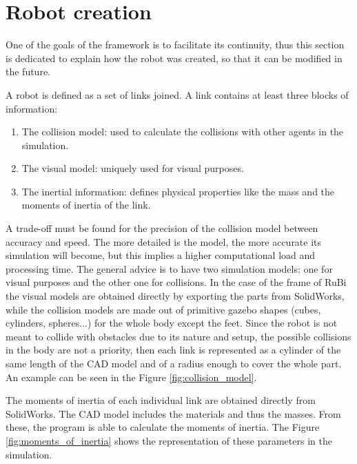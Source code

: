 \section{Robot creation} %
\label{sec:robot_creation}
One of the goals of the framework is to facilitate its continuity, thus this section is dedicated to explain how the robot was created, so that it can be modified in the future.

A robot is defined as a set of links joined.
A link contains at least three blocks of information:
\begin{enumerate}
   \item The collision model: used to calculate the collisions with other agents in the simulation.
   \item The visual model: uniquely used for visual purposes.
   \item The inertial information: defines physical properties like the mass and the moments of inertia of the link.
\end{enumerate} 

A trade-off must be found for the precision of the collision model between accuracy and speed.
The more detailed is the model, the more accurate its simulation will become, but this implies a higher computational load and processing time.
The general advice is to have two simulation models: one for visual purposes and the other one for collisions.
In the case of the frame of RuBi the visual models are obtained directly by exporting the parts from SolidWorks, while the collision models are made out of primitive gazebo shapes (cubes, cylinders, spheres...) for the whole body except the feet.
Since the robot is not meant to collide with obstacles due to its nature and setup, the possible collisions in the body are not a priority, then each link is represented as a cylinder of the same length of the CAD model and of a radius enough to cover the whole part.
An example can be seen in the Figure \ref{fig:collision_model}.

The moments of inertia of each individual link are obtained directly from SolidWorks.
The CAD model includes the materials and thus the masses.
From these, the program is able to calculate the moments of inertia.
The Figure \ref{fig:moments_of_inertia} shows the representation of these parameters in the simulation.


